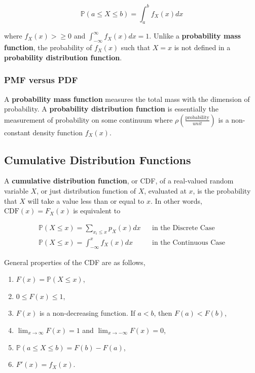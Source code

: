 \documentclass[12pt]{article}
\newcommand{\prob}[1]{\mathbb{P}(#1)}
\begin{document}
\begin{equation*}
\prob{a \leq X \leq b} = \int_{a}^{b} f_X(x) dx
\end{equation*}

\noindent
where $f_X(x) > \geq 0$ and $\int_{- \infty}^{\infty} f_X(x) dx = 1$. Unlike a \textbf{probability mass function}, the probability of $f_X(x)$ such that $X = x$ is not defined in a \textbf{probability distribution function}.

\subsubsection*{PMF versus PDF}
\noindent
A \textbf{probability mass function} measures the total mass with the dimension of probability. A \textbf{probability distribution function} is essentially the measurement of probability on some continuum where $\rho (\frac{\text{probability}}{unit})$ is a non-constant density function $f_X(x)$.

\subsection*{Cumulative Distribution Functions}
A \textbf{cumulative distribution function}, or CDF, of a real-valued random variable $X$, or just distribution function of $X$, evaluated at $x$, is the probability that $X$ will take a value less than or equal to $x$. In other words, $\text{CDF}(x) = F_X(x)$ is equivalent to 

\begin{align*}
\prob{X \leq x} = \sum_{x_i \leq x} p_X(x) dx && \text{in the Discrete Case} \\
\prob{X \leq x} = \int_{- \infty}^{x} f_X(x) dx && \text{in the Continuous Case}
\end{align*}

\noindent
General properties of the CDF are as follows,

\begin{enumerate}
\item $F(x) = \prob{X \leq x}$,
\item $0 \leq F(x) \leq 1$,
\item $F(x)$ is a non-decreasing function. If $a < b$, then $F(a) < F(b)$,
\item $\lim_{x \rightarrow \infty} F(x) = 1$ and $\lim_{x \rightarrow - \infty} F(x) = 0$, 
\item $\prob{a \leq X \leq b} = F(b) - F(a)$,
\item $F'(x) = f_X(x)$.
\end{enumerate}
\end{document}
